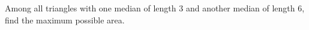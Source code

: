 Among all triangles with one median of length $3$ and another median of length $6$, find the maximum possible area.
